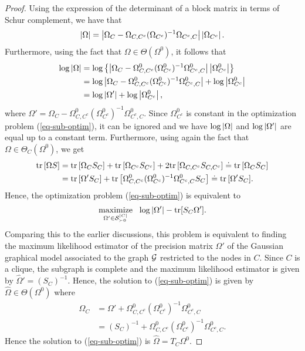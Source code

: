 \begin{proof}
    Using the expression of the determinant of a block matrix in terms of Schur complement, we have that
    \begin{equation*}
        \left|\Omega\right| 
        = \left|\Omega_C - \Omega_{C, C^c}(\Omega_{C^c})^{-1}\Omega_{C^c, C}\right| \left|\Omega_{C^c}\right|.
    \end{equation*}
    Furthermore, using the fact that $\Omega \in \Theta(\Omega^0)$, it follows that
    \begin{align*}
        \log \left|\Omega\right|
        &= \log \left\{ \left|\Omega_C - \Omega^0_{C, C^c}(\Omega^0_{C^c})^{-1}\Omega^0_{C^c, C}\right| \left|\Omega^0_{C^c}\right| \right\}\\
        &= \log \left|\Omega_C - \Omega^0_{C, C^c}(\Omega^0_{C^c})^{-1}\Omega^0_{C^c, C}\right| + \log \left|\Omega^0_{C^c}\right|\\
        &= \log \left|\Omega'\right| + \log \left|\Omega^0_{C^c}\right|,
    \end{align*}
    where $\Omega' = \Omega_C - \Omega^0_{C, C^c}(\Omega^0_{C^c})^{-1}\Omega^0_{C^c, C}$. Since $\Omega^0_{C^c}$ is constant in the optimization problem (\ref{eq-sub-optim}), it can be ignored and we have $\log \left|\Omega\right|$ and $\log \left|\Omega'\right|$ are equal up to a constant term. Furthermore, using again the fact that $\Omega \in \Theta_C(\Omega^0)$, we get
    \begin{align*}
        {\textrm{tr}\left[\Omega S\right]}
        &= {\textrm{tr}\left[\Omega_C S_C\right]} + {\textrm{tr}\left[\Omega_{C^c} S_{C^c}\right]} + 2 {\textrm{tr}\left[\Omega_{C,C^c} S_{C,C^c}\right]} 
        \doteq {\textrm{tr}\left[\Omega_C S_C\right]} \\
        &= {\textrm{tr}\left[\Omega'S_C\right]} + {\textrm{tr}\left[\Omega^0_{C, C^c}(\Omega^0_{C^c})^{-1}\Omega^0_{C^c, C}S_C\right]}
        \doteq  {\textrm{tr}\left[\Omega'S_C\right]}.
    \end{align*}
    Hence, the optimization problem (\ref{eq-sub-optim}) is equivalent to 
    \begin{equation*}
        \underset{\Omega' \in {\mathcal{S}}_{\succ 0}^{|C|}}{{\textrm{maximize}}}\ \  \log |\Omega'| - {\textrm{tr}}[S_C\Omega'].
    \end{equation*}
    Comparing this to the earlier discussions, this problem is equivalent to finding the maximum likelihood estimator of the precision matrix $\Omega'$ of the Gaussian graphical model associated to the graph ${\mathcal{G}}$ restricted to the nodes in $C$. Since $C$ is a clique, the subgraph is complete and the maximum likelihood estimator is given by $\hat\Omega' = (S_C)^{-1}$. Hence, the solution to (\ref{eq-sub-optim}) is given by $\hat\Omega \in \Theta(\Omega^0)$ where
    \begin{align*}
        \hat\Omega_C
        &= \Omega' + \Omega^0_{C, C^c}(\Omega^0_{C^c})^{-1}\Omega^0_{C^c, C}\\
        &= (S_C)^{-1} + \Omega^0_{C, C^c}(\Omega^0_{C^c})^{-1}\Omega^0_{C^c, C}.
    \end{align*}
    Hence the solution to (\ref{eq-sub-optim}) is $\hat\Omega = T_C \Omega^0$.
\end{proof}

